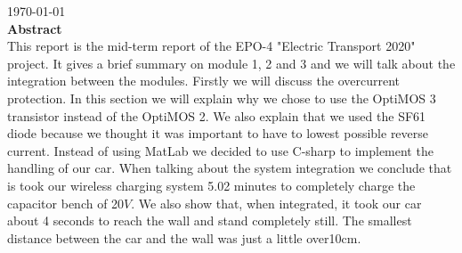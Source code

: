 \documentclass[12pt]{scrreprt}
\begin{document}
\begin{titlepage}


{\large \today}\\ [1.5cm]


 
% 

\textbf{Abstract} \\ 
This report is the mid-term report of the EPO-4 "Electric Transport 2020" project. 
It gives a brief summary on module 1, 2 and 3 and we will talk about the integration between the modules.
Firstly we will discuss the overcurrent protection. 
In this section we will explain why we chose to use the OptiMOS 3 transistor instead of the OptiMOS 2. 
We also explain that we used the SF61 diode because we thought it was important to have to lowest possible reverse current. 
Instead of using MatLab we decided to use C-sharp to implement the handling of our car. 
When talking about the system integration we conclude that is took our wireless charging system 5.02 minutes to completely charge the capacitor bench of 20$V$. 
We also show that, when integrated, it took our car about 4 seconds to reach the wall and stand completely still. 
The smallest distance between the car and the wall was just a little over10cm.


\vfill %

\end{titlepage}
\end{document}
